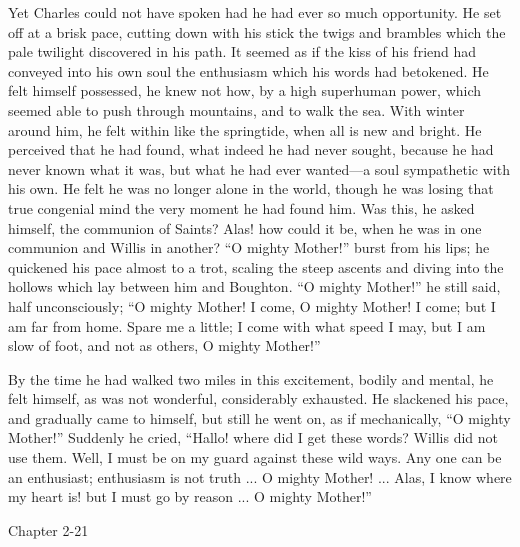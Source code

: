 Yet Charles could not have spoken had he had ever so much
opportunity. He set off at a brisk pace, cutting down with his stick
the twigs and brambles which the pale twilight discovered in his path.
It seemed as if the kiss of his friend had conveyed into his own soul
the enthusiasm which his words had betokened. He felt himself
possessed, he knew not how, by a high superhuman power, which seemed
able to push through mountains, and to walk the sea. With winter
around him, he felt within like the springtide, when all is new and
bright. He perceived that he had found, what indeed he had never
sought, because he had never known what it was, but what he had ever
wanted—a soul sympathetic with his own. He felt he was no longer
alone in the world, though he was losing that true congenial mind the
very moment he had found him. Was this, he asked himself, the
communion of Saints? Alas! how could it be, when he was in one
communion and Willis in another? ``O mighty Mother!'' burst
from his lips; he quickened his pace almost to a trot, scaling the
steep ascents and diving into the hollows which lay between him and
Boughton. ``O mighty Mother!'' he still said, half
unconsciously; ``O mighty Mother! I come, O mighty Mother! I come;
but I am far from home. Spare me a little; I come with what speed I
may, but I am slow of foot, and not as others, O mighty Mother!''

By the time he had walked two miles in this excitement, bodily and mental, he felt himself, as was not wonderful, considerably
exhausted. He slackened his pace, and gradually came to himself, but
still he went on, as if mechanically, ``O mighty Mother!''
Suddenly he cried, ``Hallo! where did I get these words? Willis
did not use them. Well, I must be on my guard against these wild ways.
Any one can be an enthusiast; enthusiasm is not truth ... O mighty
Mother! ... Alas, I know where my heart is! but I must go by reason
... O mighty Mother!''

Chapter 2-21



